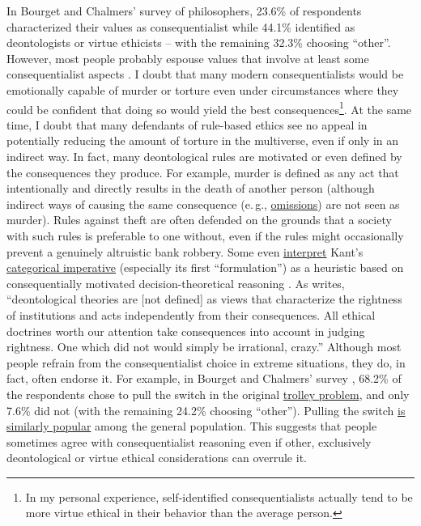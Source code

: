In Bourget and Chalmers' \citeyear{Bourget2014-fm} survey of philosophers, 23.6\%
of respondents characterized their values as consequentialist while
44.1\% identified as deontologists or virtue ethicists -- with the
remaining 32.3\% choosing ``other''. However, most people probably
espouse values that involve at least some consequentialist aspects
\parencite[cf.][section 5.3]{Muehlhauser2012-ib}. I doubt that many modern
consequentialists would be emotionally capable of murder or torture even
under circumstances where they could be confident that doing so would
yield the best consequences\footnote{In my personal experience,
  self-identified consequentialists actually tend to be more virtue
  ethical in their behavior than the average person.}. At the same time,
I doubt that many defendants of rule-based ethics see no appeal in
potentially reducing the amount of torture in the multiverse, even if
only in an indirect way. In fact, many deontological rules are motivated
or even defined by the consequences they produce. For example, murder is
defined as any act that intentionally and directly results in the death
of another person (although indirect ways of causing the same
consequence (e.\,g.,
\href{https://en.wikipedia.org/wiki/Omission_bias}{omissions})
are not seen as murder). Rules against theft are often defended on the
grounds that a society with such rules is preferable to one without,
even if the rules might occasionally prevent a genuinely altruistic bank
robbery. Some even
\href{http://briantomasik.com/interpreting-the-categorical-imperative/\#Categorical_imperative_as_decision_theory}{interpret}
Kant's
\href{https://en.wikipedia.org/wiki/Categorical_imperative}{categorical
imperative} (especially its first ``formulation'') as a heuristic based
on consequentially motivated decision-theoretical reasoning
\parencites[cf.][section 63]{Parfit2011-xj}{Hare1993-gi}. As \citet[ch. 6]{Rawls1971-sq}
writes, ``deontological theories
are {[}not defined{]} as views that characterize the rightness of
institutions and acts independently from their consequences. All ethical
doctrines worth our attention take consequences into account in judging
rightness. One which did not would simply be irrational, crazy.''
Although most people refrain from the consequentialist choice in extreme
situations, they do, in fact, often endorse it. For example, in
Bourget and Chalmers' survey \citeyear{Bourget2014-fm}, 68.2\% of the respondents
chose to pull the switch in the original
\href{https://en.wikipedia.org/wiki/Trolley_problem}{trolley
problem}, and only 7.6\% did not (with the remaining 24.2\% choosing
``other''). Pulling the switch
\href{https://en.wikipedia.org/wiki/Trolley_problem\#Psychology}{is
similarly popular} among the general population. This suggests that
people sometimes agree with consequentialist reasoning even if other,
exclusively deontological or virtue ethical considerations can overrule
it.

